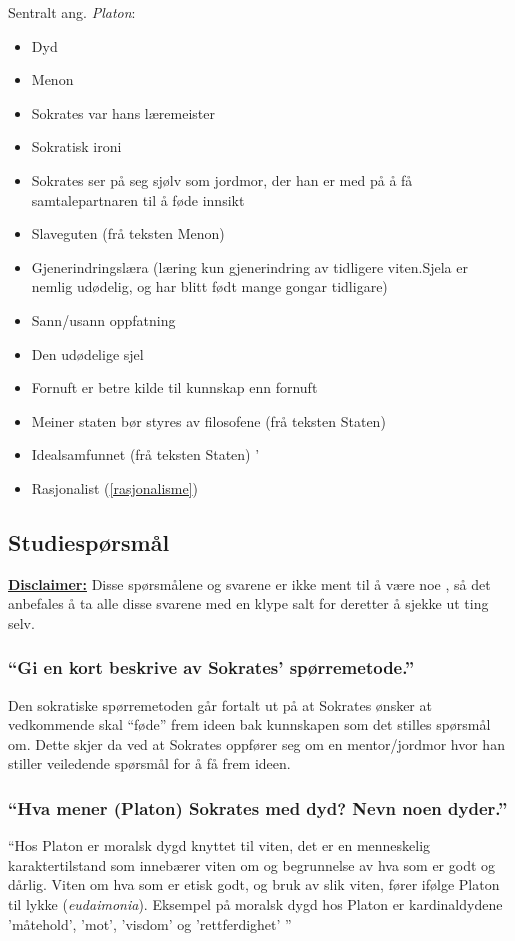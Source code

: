 \documentclass[a4paper]{IEEEtran}
\begin{document}
Sentralt ang. \textit{Platon}:
\begin{itemize}
    \bigskip
    
    \item Dyd
    \item Menon
    \item Sokrates var hans læremeister
    \item Sokratisk ironi
    \item Sokrates ser på seg sjølv som jordmor, der han er med på å få samtalepartnaren til å føde innsikt
    \item Slaveguten (frå teksten Menon)
    \item Gjenerindringslæra (læring kun gjenerindring av tidligere viten.Sjela er nemlig udødelig, og har blitt født mange gongar tidligare)
    \item Sann/usann oppfatning
    \item Den udødelige sjel
    \item Fornuft er betre kilde til kunnskap enn fornuft
    \item Meiner staten bør styres av filosofene (frå teksten Staten)
    \item Idealsamfunnet (frå teksten Staten)
    '\item Rasjonalist (\ref{rasjonalisme})
     
\end{itemize}\bigskip

    \subsection{Studiespørsmål}
    \underline{\textbf{Disclaimer:}} Disse spørsmålene og svarene er ikke ment til 
    å være noe , så det anbefales å ta alle disse svarene med en 
    klype salt for deretter å sjekke ut ting selv.
        \subsubsection{``Gi en kort beskrive av Sokrates' spørremetode.''}
        Den sokratiske spørremetoden går fortalt ut på at Sokrates ønsker at vedkommende 
        skal ``føde'' frem ideen bak kunnskapen som det stilles spørsmål om. 
        Dette skjer da ved at Sokrates oppfører seg om en mentor/jordmor hvor
        han stiller veiledende spørsmål for å få frem ideen. \medskip

        \subsubsection{``Hva mener (Platon) Sokrates med dyd? Nevn noen dyder.''}
        ``Hos Platon er moralsk dygd knyttet til viten, det er en menneskelig 
        karaktertilstand som innebærer viten om og begrunnelse av hva som er godt 
        og dårlig. Viten om hva som er etisk godt, og bruk av slik viten, fører 
        ifølge Platon til lykke (\textit{eudaimonia}). Eksempel på moralsk 
        dygd hos Platon er kardinaldydene 'måtehold', 'mot', 'visdom' og 
        'rettferdighet' ''\cite{snl_dyd} \medskip
\end{document}
